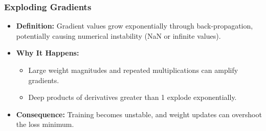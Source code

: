 \documentclass{article}
\begin{document}
\subsubsection{Exploding Gradients}
\begin{itemize}
    \item \textbf{Definition:} Gradient values grow exponentially through back-propagation, potentially causing numerical instability (NaN or infinite values).
    \item \textbf{Why It Happens:}
    \begin{itemize}
        \item Large weight magnitudes and repeated multiplications can amplify gradients.
        \item Deep products of derivatives greater than 1 explode exponentially.
    \end{itemize}
    \item \textbf{Consequence:} Training becomes unstable, and weight updates can overshoot the loss minimum.
\end{itemize}
\end{document}
